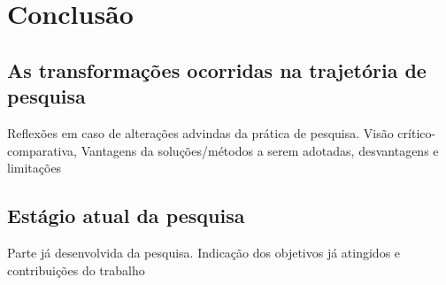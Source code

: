 \chapter{Conclusão}

\section {As transformações ocorridas na trajetória de pesquisa}
Reflexões em caso de alterações advindas da prática de pesquisa. Visão crítico-comparativa, Vantagens da soluções/métodos a serem adotadas, desvantagens e limitações


\section {Estágio atual da pesquisa}
Parte já desenvolvida da pesquisa. Indicação dos objetivos já atingidos e contribuições do trabalho